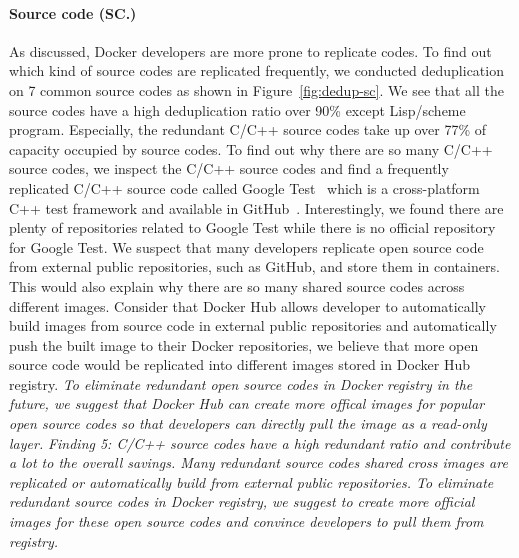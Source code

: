 \paragraph{Source code (SC.)}
%
%
As discussed, Docker developers are more prone to replicate codes. 
To find out which kind of source codes are replicated frequently, we conducted deduplication on 7 common source codes as shown in Figure~\ref{fig:dedup-sc}.
%
We see that all the source codes have a high deduplication ratio over 90\% except 
Lisp/scheme program. Especially, the redundant C/C++ source codes take up over 77\% of capacity occupied by source codes. To find out why there are so many C/C++ source codes, we inspect the C/C++ source codes and find a frequently replicated C/C++ source code called Google Test~\cite{xxx} which is a cross-platform C++ test framework and available in GitHub~\cite{xxx}. Interestingly, we found there are plenty of repositories related to Google Test while there is no official repository for Google Test. We suspect that many developers replicate open source code from external public repositories, such as GitHub, and store them in containers. This would also explain why there are so many shared source codes across different images.
Consider that Docker Hub allows developer to automatically build images from source code in external public repositories and automatically push the built image to their Docker repositories, we believe that more open source code would be replicated into different images stored in Docker Hub registry. \textit{To eliminate redundant open source codes in Docker registry in the future, we suggest that Docker Hub can create more offical images for popular open source codes so that developers can directly pull the image as a read-only layer. }
%
\textit{Finding 5: C/C++ source codes have a high redundant ratio and contribute a lot to the overall savings. Many redundant source codes shared cross images are replicated or automatically build from external public repositories. To eliminate redundant source codes in Docker registry, we suggest to create more official images for these open source codes and convince developers to pull them from registry.}
%
